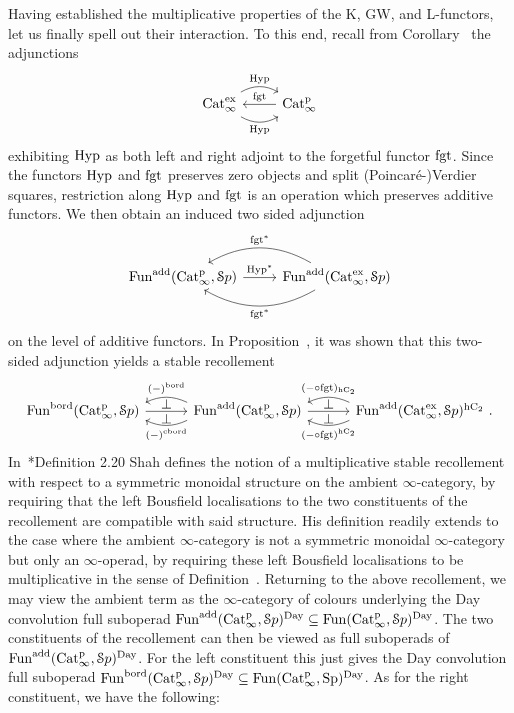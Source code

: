 Having established the multiplicative properties of the K, GW, and L-functors, let us finally spell out their interaction. To this end, recall from Corollary~ the adjunctions  
\begin{equation}
\label{equation:two-sided}%
\begin{tikzcd}
	\Catx \ar[r, bend right,"\Hyp"'] \ar[r, bend left,"\Hyp"] & \Catp \ar[l, "\mathrm{fgt}"']
\end{tikzcd}
\end{equation}
exhibiting $\operatorname{Hyp}$ as both left and right adjoint to the forgetful functor $\mathrm{fgt}$. Since the functors $\operatorname{Hyp}$ and $\mathrm{fgt}$ preserves zero objects and split (Poincaré-)Verdier squares, restriction along $\operatorname{Hyp}$ and $\mathrm{fgt}$ is an operation which preserves additive functors. We then obtain an induced two sided adjunction 
\[
\begin{tikzcd}
	\Funadd(\Catp,\Spa) \ar[r, "\Hyp^*"]  & \Funadd(\Catx,\Spa) \ar[l, bend right,"\fgt^*"'] \ar[l, bend left,"\fgt^*"]
\end{tikzcd}
\]
on the level of additive functors.
In Proposition~, it was shown that this two-sided adjunction yields a stable recollement
\[
\begin{tikzcd}
[column sep=7ex]
\Funbord(\Catp,\Spa) \ar[r] & 
\Funadd(\Catp,\Spa) 
\ar[r] 
\ar[l,bend left=25,shift left=1.5ex,start anchor=west,end anchor=east, "(-)^{\rbord}"] 
\ar[l,bend right=25,shift right=1.5ex,start anchor=west,end anchor=east,"(-)^{\bord}"'] 
\ar[l,phantom,shift left=1.2ex,start anchor=west,end anchor=east,"\perp"] 
\ar[l,phantom,shift right=1.3ex,start anchor=west,end anchor=east,"\perp"]
& \Funadd(\Catx,\Spa)^\hC \ .
\ar[l,bend left=25,shift left=1.5ex,start anchor=west,end anchor=east,"{(- \circ \fgt)^\hC}"] 
\ar[l,bend right=25,shift right=1.5ex,start anchor=west,end anchor=east,"{(- \circ \fgt)_\hC}"']
\ar[l,phantom,shift left=1.2ex,start anchor=west,end anchor=east,"\perp"] 
\ar[l,phantom,shift right=1.3ex,start anchor=west,end anchor=east,"\perp"]
\end{tikzcd}
\]
In~\cite{shah2021recollements}*{Definition 2.20} Shah defines the notion of a multiplicative stable recollement with respect to a symmetric monoidal structure on the ambient $\infty$-category, by requiring that the left Bousfield localisations to the two constituents of the recollement are compatible with said structure. 
His definition readily extends to the case where the ambient $\infty$-category is not a symmetric monoidal $\infty$-category but only an $\infty$-operad, by requiring these left Bousfield localisations to be multiplicative in the sense of Definition~. 
Returning to the above recollement, we may view the ambient term as the $\infty$-category of colours underlying the Day convolution full suboperad $\operatorname{Fun}^{\mathrm{add}}(\mathrm{Cat}^{\mathrm p}_\infty,{\mathcal Sp})^{\mathrm{Day}} \subseteq \operatorname{Fun}(\mathrm{Cat}^{\mathrm p}_\infty,{\mathcal Sp})^{\mathrm{Day}}$. The two constituents of the recollement can then be viewed as full suboperads of $\operatorname{Fun}^{\mathrm{add}}(\mathrm{Cat}^{\mathrm p}_\infty,{\mathcal Sp})^{\mathrm{Day}}$. For the left constituent this just gives the Day convolution full suboperad $\operatorname{Fun}^{\mathrm{bord}}(\mathrm{Cat}^{\mathrm p}_\infty,{\mathcal Sp})^{\mathrm{Day}} \subseteq \operatorname{Fun}(\mathrm{Cat}^{\mathrm p}_\infty,\mathrm{Sp})^{\mathrm{Day}}$. As for the right constituent, we have the following:

